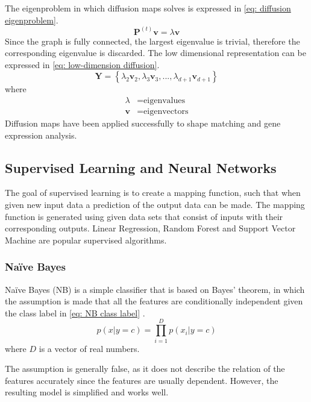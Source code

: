\documentclass[11pt,twocolumn]{witseiepaper}
\begin{document}
	The eigenproblem in which diffusion maps solves is expressed in \eqref{eq: diffusion eigenproblem}. 
	\begin{equation}
		\textbf{P}^{(t)}\textbf{v} = \lambda\textbf{v}
		\label{eq: diffusion eigenproblem}
	\end{equation}
	Since the graph is fully connected, the largest eigenvalue is trivial, therefore the corresponding eigenvalue is discarded. The low dimensional representation can be expressed in \eqref{eq: low-dimension diffusion}.
	\begin{equation}
		\textbf{Y} = \left\{\lambda_2\textbf{v}_2, \lambda_3\textbf{v}_3,...,\lambda_{d+1}\textbf{v}_{d+1} \right\}
		\label{eq: low-dimension diffusion}
	\end{equation}
	where
	\vspace{-3mm}
	\begin{align*}
		\lambda &= \text{eigenvalues}\\
		\textbf{v} &= \text{eigenvectors}
	\end{align*}
	Diffusion maps have been applied successfully to shape matching and gene expression analysis.
	
	\subsection{Supervised Learning and Neural Networks}
	The goal of supervised learning is to create a mapping function, such that when given new input data a prediction of the output data can be made. The mapping function is generated using given data sets that consist of inputs with their corresponding outputs. Linear Regression, Random Forest and Support Vector Machine are popular supervised algorithms.
	
	\subsubsection{Na\"{i}ve Bayes}
	Na\"{i}ve Bayes (NB) is a simple classifier that is based on Bayes' theorem, in which the assumption is made that all the features are conditionally independent given the class label in \eqref{eq: NB class label} \cite{Murphy2006}. 
	\begin{equation}
		\label{eq: NB class label}
		p(x | y = c) = \prod_{i = 1}^{D}p(x_i | y = c)
	\end{equation}
	where $D$ is a vector of real numbers.
	
	The assumption is generally false, as it does not describe the relation of the features accurately since the features are usually dependent. However, the resulting model is simplified and works well.
	
\end{document}
